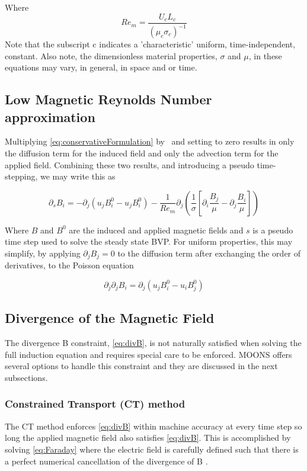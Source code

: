 Where
\begin{equation} \label{eq:Rem}
Re_m = \frac{U_c L_c}{(\mu_c \sigma_c)^{-1}}
\end{equation}
Note that the subscript c indicates a 'characteristic' uniform, time-independent, constant. Also note, the dimensionless material properties, $\sigma$ and $\mu$, in these equations may vary, in general, in space and or time.

\subsection{Low Magnetic Reynolds Number approximation}
Multiplying \ref{eq:conservativeFormulation} by \Rem\ and setting \Rem to zero results in only the diffusion term for the induced field and only the advection term for the applied field. Combining these two results, and introducing a pseudo time-stepping, we may write this as

\begin{equation} \label{eq:LowRemPsuedo}
\partial_s B_i = -\partial_j (u_j B_i^0 - u_j B_i^0)
-\frac{1}{Re_m} \partial_j \left( \frac{1}{\sigma} \left[ \partial_i \frac{B_j}{\mu} - \partial_j \frac{B_i}{\mu} \right] \right)
\end{equation}

Where $B$ and $B^0$ are the induced and applied magnetic fields and $s$ is a pseudo time step used to solve the steady state BVP. For uniform properties, this may simplify, by applying $\partial_j B_j = 0$ to the diffusion term after exchanging the order of derivatives, to the Poisson equation

\begin{equation} \label{eq:LowRemPoisson}
\partial_j \partial_j B_i = \partial_j (u_j B_i^0 - u_i B_j^0)
\end{equation}

\subsection{Divergence of the Magnetic Field}
The divergence B constraint, \ref{eq:divB}, is not naturally satisfied when solving the full induction equation and requires special care to be enforced. MOONS offers several options to handle this constraint and they are discussed in the next subsections.

\subsubsection{Constrained Transport (CT) method}
The CT method enforces \ref{eq:divB} within machine accuracy at every time step so long the applied magnetic field also satisfies \ref{eq:divB}. This is accomplished by solving \ref{eq:Faraday} where the electric field is carefully defined such that there is a perfect numerical cancellation of the divergence of B \cite{Toth2000}.

